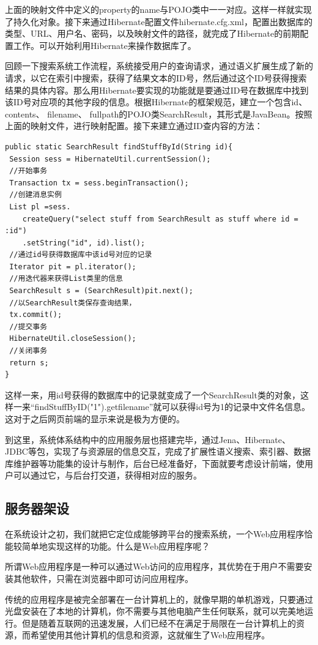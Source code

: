 \documentclass[12pt,a4paper]{article}
\begin{document}
	上面的映射文件中定义的property的name与POJO类中一一对应。这样一样就实现了持久化对象。接下来通过Hibernate配置文件hibernate.cfg.xml，配置出数据库的类型、URL、用户名、密码，以及映射文件的路径，就完成了Hibernate的前期配置工作。可以开始利用Hibernate来操作数据库了。
	
	回顾一下搜索系统工作流程，系统接受用户的查询请求，通过语义扩展生成了新的请求，以它在索引中搜索，获得了结果文本的ID号，然后通过这个ID号获得搜索结果的具体内容。那么用Hibernate要实现的功能就是要通过ID号在数据库中找到该ID号对应项的其他字段的信息。根据Hibernate的框架规范，建立一个包含id、 contents、 filename、 fullpath的POJO类SearchResult，其形式是JavaBean。按照上面的映射文件，进行映射配置。接下来建立通过ID查内容的方法：
	
\lstset{language=Java,frame=lines}
\begin{lstlisting}
public static SearchResult findStuffById(String id){
 Session sess = HibernateUtil.currentSession();
 //开始事务
 Transaction tx = sess.beginTransaction();
 //创建消息实例
 List pl =sess.
 	createQuery("select stuff from SearchResult as stuff where id = :id")
 	.setString("id", id).list();
 //通过id号获得数据库中该id号对应的记录
 Iterator pit = pl.iterator();
 //用迭代器来获得List类里的信息
 SearchResult s = (SearchResult)pit.next();
 //以SearchResult类保存查询结果，
 tx.commit();
 //提交事务
 HibernateUtil.closeSession();
 //关闭事务
 return s;
}
\end{lstlisting}	

	这样一来，用id号获得的数据库中的记录就变成了一个SearchResult类的对象，这样一来“findStuffByID("1").getfilename”就可以获得id号为1的记录中文件名信息。这对于之后网页前端的显示来说是极为方便的。
	
	到这里，系统体系结构中的应用服务层也搭建完毕，通过Jena、Hibernate、JDBC等包，实现了与资源层的信息交互，完成了扩展性语义搜索、索引器、数据库维护器等功能集的设计与制作，后台已经准备好，下面就要考虑设计前端，使用户可以通过它，与后台打交道，获得相对应的服务。

	\subsection{服务器架设}
	
	在系统设计之初，我们就把它定位成能够跨平台的搜索系统，一个Web应用程序恰能较简单地实现这样的功能。什么是Web应用程序呢？
	
	所谓Web应用程序是一种可以通过Web访问的应用程序，其优势在于用户不需要安装其他软件，只需在浏览器中即可访问应用程序。
	
	传统的应用程序是被完全部署在一台计算机上的，就像早期的单机游戏，只要通过光盘安装在了本地的计算机，你不需要与其他电脑产生任何联系，就可以完美地运行。但是随着互联网的迅速发展，人们已经不在满足于局限在一台计算机上的资源，而希望使用其他计算机的信息和资源，这就催生了Web应用程序。
	
\end{document}
